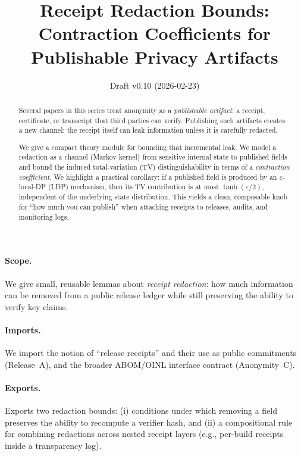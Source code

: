 \documentclass[11pt]{article}
\title{Receipt Redaction Bounds:\\ Contraction Coefficients for Publishable Privacy Artifacts}
\author{}
\date{Draft v0.10 (2026-02-23)}
\begin{document}
\maketitle

\begin{abstract}
Several papers in this series treat anonymity as a \emph{publishable artifact}: a receipt, certificate, or transcript that third parties can verify.
Publishing such artifacts creates a new channel: the receipt itself can leak information unless it is carefully redacted.

We give a compact theory module for bounding that incremental leak.
We model a redaction as a channel (Markov kernel) from sensitive internal state to published fields and bound the induced total-variation (TV) distinguishability in terms of a \emph{contraction coefficient}.
We highlight a practical corollary: if a published field is produced by an $\varepsilon$-local-DP (LDP) mechanism, then its TV contribution is at most $\tanh(\varepsilon/2)$, independent of the underlying state distribution.
This yields a clean, composable knob for ``how much you can publish'' when attaching receipts to releases, audits, and monitoring logs.
\end{abstract}

\paragraph{Scope.}
We give small, reusable lemmas about \emph{receipt redaction}: how much information can be removed from a public release ledger while still preserving the ability to verify key claims.

\paragraph{Imports.}
We import the notion of ``release receipts'' and their use as public commitments (Release~A), and the broader ABOM/OINL interface contract (Anonymity~C).\cite{series:releaseproperty,series:abomoinl}

\paragraph{Exports.}
Exports two redaction bounds: (i) conditions under which removing a field preserves the ability to recompute a verifier hash, and (ii) a compositional rule for combining redactions across nested receipt layers (e.g., per-build receipts inside a transparency log).
\end{document}
